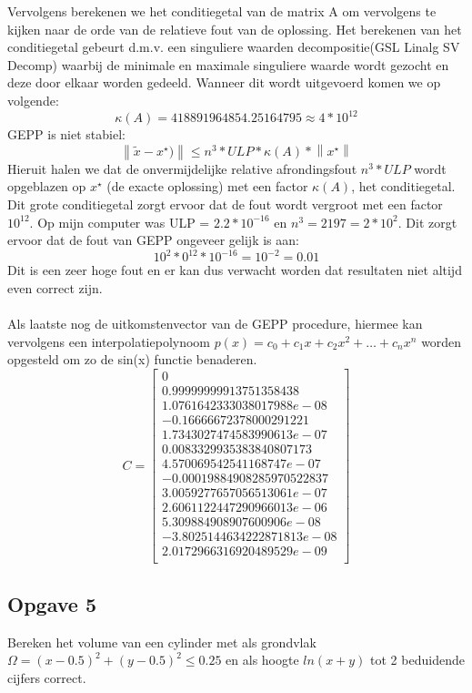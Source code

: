 \documentclass[10pt,a4paper]{article}
\begin{document}
Vervolgens berekenen we het conditiegetal van de matrix A om vervolgens te kijken naar de orde van de relatieve fout van de oplossing. Het berekenen van het conditiegetal gebeurt d.m.v. een singuliere waarden decompositie(GSL Linalg SV Decomp) waarbij de minimale en maximale singuliere waarde wordt gezocht en deze door elkaar worden gedeeld. Wanneer dit wordt uitgevoerd komen we op volgende:
$$
\kappa (A) = 418891964854.25164795 \approx 4*10^{12}
$$
GEPP is niet stabiel:
$$
\left \| \tilde{x} - x^{\star}) \right \| \leq n^3*ULP*\kappa(A)*\left \|  x^{\star} \right \|
$$
Hieruit halen we dat de onvermijdelijke relative afrondingsfout  $n^{3}*ULP$ wordt opgeblazen op $x^{\star}$ (de exacte oplossing) met een factor $\kappa(A)$, het conditiegetal. Dit grote conditiegetal zorgt ervoor dat de fout wordt vergroot met een factor $10^{12}$. Op mijn computer was ULP = $2.2*10^{-16}$ en $n^3 = 2197 = 2 * 10^{2}$. Dit zorgt ervoor dat de fout van GEPP ongeveer gelijk is aan: 
$$  10^{2} * 0^{12} * 10^{-16} = 10^{-2} = 0.01$$
Dit is een zeer hoge fout en er kan dus verwacht worden dat resultaten niet altijd even correct zijn.
\\
\\
Als laatste nog de uitkomstenvector van de GEPP procedure, hiermee kan vervolgens een interpolatiepolynoom $p(x) = c_{0} + c_{1}x + c_{2}x^{2} + \hdots + c_{n}x^{n}$ worden opgesteld om zo de sin(x) functie benaderen.
\\
$$
C =  \begin{bmatrix}
0 \\
0.99999999913751358438 \\
1.0761642333038017988e-08 \\
-0.16666672378000291221 \\
1.7343027474583990613e-07 \\
0.0083329935383840807173 \\
4.570069542541168747e-07 \\
-0.00019884908285970522837 \\
3.0059277657056513061e-07 \\
2.6061122447290966013e-06 \\
5.309884908907600906e-08 \\
-3.8025144634222871813e-08 \\
2.0172966316920489529e-09 \\
\end{bmatrix} 
$$
\subsection{Opgave 5}
Bereken het volume van een cylinder met als grondvlak $\Omega  = (x-0.5)^{2} + (y-0.5)^{2} \leq 0.25 $ en als hoogte $ln(x + y)$ tot 2 beduidende cijfers correct.
\end{document}
